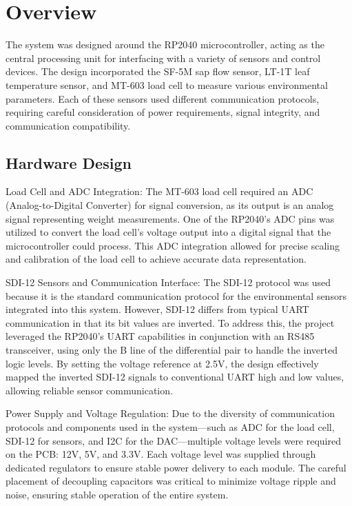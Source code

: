 \section{Overview}

The system was designed around the RP2040 microcontroller, acting as the central processing unit for interfacing with a variety of sensors and control devices. The design incorporated the SF-5M sap flow sensor, LT-1T leaf temperature sensor, and MT-603 load cell to measure various environmental parameters. Each of these sensors used different communication protocols, requiring careful consideration of power requirements, signal integrity, and communication compatibility.

\subsection{Hardware Design}
Load Cell and ADC Integration: The MT-603 load cell required an ADC (Analog-to-Digital Converter) for signal conversion, as its output is an analog signal representing weight measurements. One of the RP2040's ADC pins was utilized to convert the load cell's voltage output into a digital signal that the microcontroller could process. This ADC integration allowed for precise scaling and calibration of the load cell to achieve accurate data representation.

SDI-12 Sensors and Communication Interface: The SDI-12 protocol was used because it is the standard communication protocol for the environmental sensors integrated into this system. However, SDI-12 differs from typical UART communication in that its bit values are inverted. To address this, the project leveraged the RP2040's UART capabilities in conjunction with an RS485 transceiver, using only the B line of the differential pair to handle the inverted logic levels. By setting the voltage reference at 2.5V, the design effectively mapped the inverted SDI-12 signals to conventional UART high and low values, allowing reliable sensor communication.

Power Supply and Voltage Regulation: Due to the diversity of communication protocols and components used in the system—such as ADC for the load cell, SDI-12 for sensors, and I2C for the DAC—multiple voltage levels were required on the PCB: 12V, 5V, and 3.3V. Each voltage level was supplied through dedicated regulators to ensure stable power delivery to each module. The careful placement of decoupling capacitors was critical to minimize voltage ripple and noise, ensuring stable operation of the entire system.

